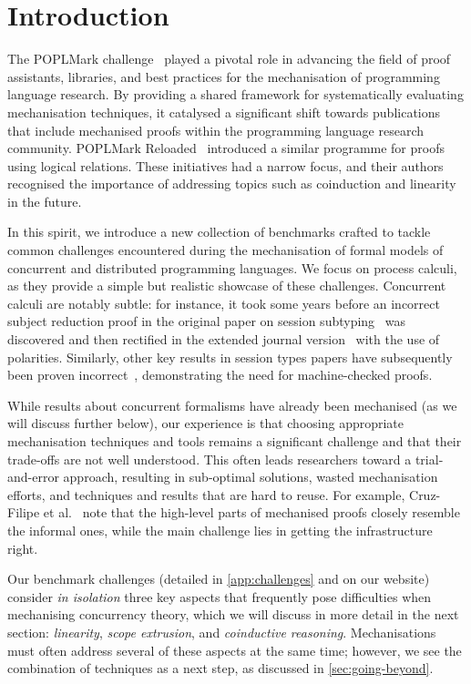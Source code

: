 \documentclass[runningheads]{llncs}
\begin{document}
\section{Introduction}
The POPLMark challenge~\cite{POPLMark}
played a pivotal role in advancing the field of proof assistants,
libraries, and best practices for the mechanisation of programming language research. By providing a shared framework for systematically
evaluating mechanisation techniques, it catalysed a significant
shift towards publications that include mechanised proofs within the programming language research community.
POPLMark Reloaded~\cite{POPLMarkReloaded} introduced a similar programme for proofs using logical relations.
These initiatives had a narrow focus, and their authors recognised the importance of addressing topics such as coinduction and linearity in the future.

In this spirit, we introduce a new collection of benchmarks 
crafted to tackle common challenges encountered during
the mechanisation of formal models of concurrent and distributed
programming languages.  We focus on process calculi, as
they provide a simple but realistic showcase of these challenges.  Concurrent calculi are
notably subtle: for instance, it took some years before an incorrect
subject reduction proof in the original paper on session
subtyping~\cite{GH99} was discovered and then rectified in the extended journal version~\cite{GH05} with the use of
polarities.
Similarly, other key results in session types papers have subsequently
been proven incorrect~\cite{Gay2020,10.1145/3290343}, demonstrating the
need for machine-checked proofs.

While results about concurrent
formalisms have already been mechanised (as we will discuss further
below), our experience is that choosing appropriate mechanisation
techniques and tools remains a significant challenge and that their
trade-offs are not well understood.  This often leads researchers
toward a trial-and-error approach, resulting in sub-optimal solutions,
wasted mechanisation efforts, and techniques and results that are hard
to reuse. For example, Cruz-Filipe et al.~\cite{Cruz-Filipe2021b} note that the high-level parts of
mechanised proofs closely resemble the informal ones, while the
main challenge lies in getting the infrastructure right.

Our benchmark challenges (detailed in \cref{app:challenges} and on our website) consider
\emph{in isolation} three key aspects that frequently pose difficulties
when mechanising concurrency theory, which we will discuss in more detail in the next section: \emph{linearity}, \emph{scope
  extrusion}, and \emph{coinductive reasoning}.
Mechanisations must often address several of these aspects at the same time; however, we
see the combination of techniques as a next
step, as discussed in \cref{sec:going-beyond}.
\end{document}

